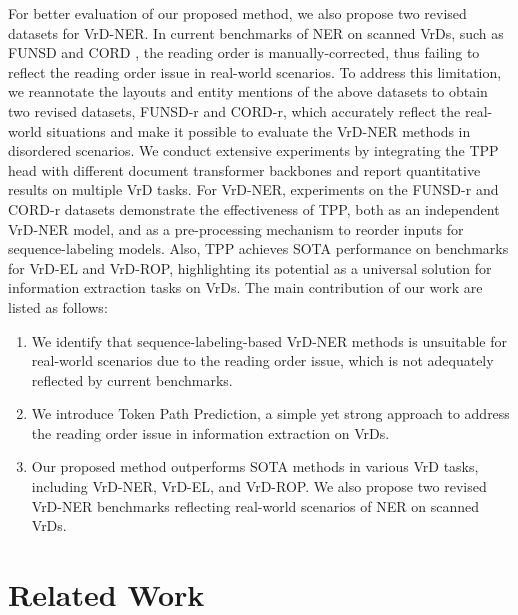 \documentclass[11pt]{article}
\begin{document}
For better evaluation of our proposed method, we also propose two revised datasets for VrD-NER. 
In current benchmarks of NER on scanned VrDs, such as FUNSD \citep{jaume2019funsd} and CORD \citep{park2019cord}, the reading order is manually-corrected, thus failing to reflect the reading order issue in real-world scenarios. 
To address this limitation, we reannotate the layouts and entity mentions of the above datasets to obtain two revised datasets, FUNSD-r and CORD-r, which accurately reflect the real-world situations and make it possible to evaluate the VrD-NER methods in disordered scenarios.
We conduct extensive experiments by integrating the TPP head with different document transformer backbones and report quantitative results on multiple VrD tasks. 
For VrD-NER, experiments on the FUNSD-r and CORD-r datasets demonstrate the effectiveness of TPP, both as an independent VrD-NER model, and as a pre-processing mechanism to reorder inputs for sequence-labeling models. 
Also, TPP achieves SOTA performance on benchmarks for VrD-EL and VrD-ROP, highlighting its potential as a universal solution for information extraction tasks on VrDs.
The main contribution of our work are listed as follows:
\begin{enumerate}[leftmargin=*,noitemsep,topsep=0pt]
    \item We identify that sequence-labeling-based VrD-NER methods is unsuitable for real-world scenarios due to the reading order issue, which is not adequately reflected by current benchmarks.
    \item We introduce Token Path Prediction, a simple yet strong approach to address the reading order issue in information extraction on VrDs. 
    \item Our proposed method outperforms SOTA methods in various VrD tasks, including VrD-NER, VrD-EL, and VrD-ROP. We also propose two revised VrD-NER benchmarks reflecting real-world scenarios of NER on scanned VrDs.  
\end{enumerate}

\section{Related Work}
\end{document}
